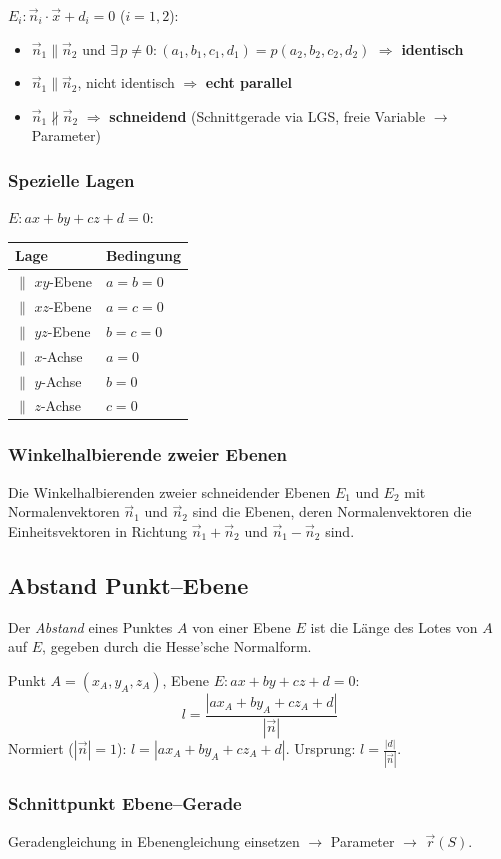 $E_i\colon \vec{n}_i \cdot \vec{x} + d_i = 0$ \; ($i=1,2$):
\begin{itemize}[leftmargin=*, itemsep=0pt]
     \item $\vec{n}_1 \parallel \vec{n}_2$ und $\exists\,p\neq 0\colon (a_1,b_1,c_1,d_1)=p(a_2,b_2,c_2,d_2)$ $\Rightarrow$ \textbf{identisch}
     \item $\vec{n}_1 \parallel \vec{n}_2$, nicht identisch $\Rightarrow$ \textbf{echt parallel}
     \item $\vec{n}_1 \nparallel \vec{n}_2$ $\Rightarrow$ \textbf{schneidend} (Schnittgerade via LGS, freie Variable $\to$ Parameter)
\end{itemize}

\subsubsection{Spezielle Lagen}

$E\colon ax+by+cz+d=0$:

\begin{center}
\small
\begin{tabular}{ll}
     \hline
     \textbf{Lage} & \textbf{Bedingung} \\
     \hline
     $\parallel$ $xy$-Ebene & $a=b=0$ \\
     $\parallel$ $xz$-Ebene & $a=c=0$ \\
     $\parallel$ $yz$-Ebene & $b=c=0$ \\
     $\parallel$ $x$-Achse  & $a=0$ \\
     $\parallel$ $y$-Achse  & $b=0$ \\
     $\parallel$ $z$-Achse  & $c=0$ \\
     \hline
\end{tabular}
\end{center}

\subsubsection{Winkelhalbierende zweier Ebenen}
Die Winkelhalbierenden zweier schneidender Ebenen $E_1$ und $E_2$ mit Normalenvektoren $\vec{n}_1$ und $\vec{n}_2$ sind die Ebenen, deren Normalenvektoren die Einheitsvektoren in Richtung $\vec{n}_1 + \vec{n}_2$ und $\vec{n}_1 - \vec{n}_2$ sind.


\subsection{Abstand Punkt–Ebene}

Der \emph{Abstand} eines Punktes $A$ von einer Ebene $E$ ist die Länge des Lotes von $A$ auf $E$, gegeben durch die Hesse'sche Normalform.

Punkt $A=(x_A,y_A,z_A)$, Ebene $E\colon ax+by+cz+d=0$:
\[
     l = \frac{|ax_A + by_A + cz_A + d|}{|\vec{n}|}
\]
Normiert ($|\vec{n}|=1$): $l = |ax_A + by_A + cz_A + d|$. \quad Ursprung: $l = \frac{|d|}{|\vec{n}|}$.

\subsubsection{Schnittpunkt Ebene–Gerade}
Geradengleichung in Ebenengleichung einsetzen $\to$ Parameter $\to$ $\vec{r}(S)$.
